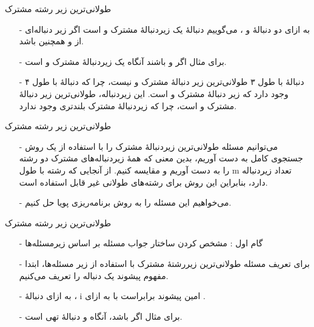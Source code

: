 \begin{frame}{‌طولانی‌ترین زیر رشته مشترک}
\begin{itemize}\itemr
\item[-]
به ازای دو دنبالهٔ
و
، می‌گوییم دنبالهٔ
یک زیردنبالهٔ مشترک
و
است اگر
زیر دنباله‌ای از
و همچنین
باشد.
\item[-]
برای مثال اگر
و
باشند آنگاه
یک زیردنبالهٔ مشترک
و
است.
\item[-]
دنبالهٔ
با طول ۳ طولانی‌ترین زیر دنبالهٔ مشترک
و
نیست، چرا که دنبالهٔ
با طول ۴ وجود دارد که زیر دنبالهٔ مشترک
و
است. این زیردنباله، طولانی‌ترین زیر دنبالهٔ مشترک
و
است، چرا که زیردنبالهٔ مشترک بلندتری وجود ندارد.
\end{itemize}
\end{frame}



\begin{frame}{‌طولانی‌ترین زیر رشته مشترک}
\begin{itemize}\itemr
\item[-]
می‌توانیم مسئله طولانی‌ترین زیردنبالهٔ مشترک را با استفاده از یک روش جستجوی کامل
به دست آوریم، بدین معنی که همهٔ زیردنباله‌های مشترک دو رشته را به دست آوریم و مقایسه کنیم. از آنجایی که رشته
با طول m تعداد
زیردنباله دارد، بنابراین این روش برای رشته‌های طولانی غیر قابل استفاده است.
\item[-]
می‌خواهیم این مسئله را به روش برنامه‌ریزی پویا حل کنیم.
\end{itemize}
\end{frame}



\begin{frame}{‌طولانی‌ترین زیر رشته مشترک}
\begin{itemize}\itemr
\item[-]
گام اول : مشخص کردن ساختار جواب مسئله بر اساس زیرمسئله‌ها
\item[-]
برای تعریف مسئله طولانی‌ترین زیررشتهٔ مشترک با استفاده از زیر مسئله‌ها، ابتدا مفهوم پیشوند
یک دنباله را تعریف می‌کنیم.
\item[-]
به ازای دنبالهٔ
،
i
امین پیشوند
برابراست با
به ازای
.
\item[-]
برای مثال اگر
باشد، آنگاه
و
دنبالهٔ تهی است.
\end{itemize}
\end{frame}



